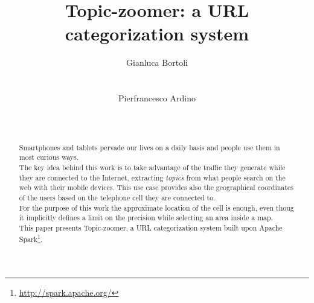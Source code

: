 \documentclass{sig-alternate-05-2015}
\begin{document}
\title{Topic-zoomer: a URL categorization system}

\author{
    \alignauthor
    Gianluca Bortoli\\
           \\
           \\
    \alignauthor
    Pierfrancesco Ardino\\
           \\
           \\
    }
\maketitle


\begin{abstract}
Smartphones and tablets pervade our lives on a daily basis and people use them in most curious ways.\\ 
The key idea behind this work is to take advantage of the traffic they generate while they are connected to the Internet, extracting \emph{topics} from what people search on the web with their mobile devices. This use case provides also the geographical coordinates of the users based on the telephone cell they are connected to.\\
For the purpose of this work the approximate location of the cell is enough, even thoug it implicitly defines a limit on the precision while selecting an area inside a map.\\
This paper presents Topic-zoomer, a URL categorization system built upon Apache Spark\footnote{\url{http://spark.apache.org/}}.
\end{abstract}


\printccsdesc
{}
\end{document}
